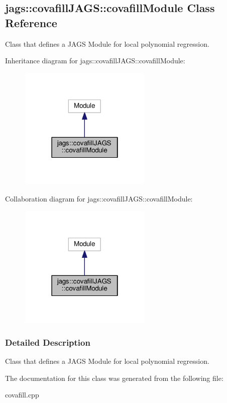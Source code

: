\hypertarget{classjags_1_1covafillJAGS_1_1covafillModule}{}\subsection{jags\+:\+:covafill\+J\+A\+G\+S\+:\+:covafill\+Module Class Reference}
\label{classjags_1_1covafillJAGS_1_1covafillModule}


Class that defines a J\+A\+G\+S Module for local polynomial regression.  




Inheritance diagram for jags\+:\+:covafill\+J\+A\+G\+S\+:\+:covafill\+Module\+:\nopagebreak
\begin{figure}[H]
\begin{center}
\leavevmode
\includegraphics[width=178pt]{classjags_1_1covafillJAGS_1_1covafillModule__inherit__graph}
\end{center}
\end{figure}


Collaboration diagram for jags\+:\+:covafill\+J\+A\+G\+S\+:\+:covafill\+Module\+:\nopagebreak
\begin{figure}[H]
\begin{center}
\leavevmode
\includegraphics[width=178pt]{classjags_1_1covafillJAGS_1_1covafillModule__coll__graph}
\end{center}
\end{figure}


\subsubsection{Detailed Description}
Class that defines a J\+A\+G\+S Module for local polynomial regression. 

The documentation for this class was generated from the following file\+:\begin{DoxyCompactItemize}
\item 
covafill.\+cpp\end{DoxyCompactItemize}
